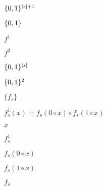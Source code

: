 \documentclass[10pt]{book}
\begin{document}
\begin{mdSnippets}
\begin{mdInlineSnippet}
$\{0,1\}^{|s|+1}$\end{mdInlineSnippet}%
\begin{mdInlineSnippet}[69d364206d67dcdb68878f093fc16950]%
$\{0,1\}$\end{mdInlineSnippet}%
\begin{mdInlineSnippet}[cae89de5c4de9177d656a557bb208967]%
$f^1$\end{mdInlineSnippet}%
\begin{mdInlineSnippet}[fb4f23824ac2741ea310a44278a235b2]%
$f^2$\end{mdInlineSnippet}%
\begin{mdInlineSnippet}[534ffd86f3d153918028a456538c34d8]%
$\{0,1\}^{|s|}$\end{mdInlineSnippet}%
\begin{mdInlineSnippet}%
$\{0,1\}^2$\end{mdInlineSnippet}%
\begin{mdInlineSnippet}[37a2ce8e5337ae1139e64a8ff1f2f6bb]%
$\{ f_s \}$\end{mdInlineSnippet}%
\begin{mdInlineSnippet}[0ca5bb58d5b81f7d402212fa3ebc2e85]%
$f^1_s(x)=f_s(0\circ x) \circ f_s(1\circ x)$\end{mdInlineSnippet}%
\begin{mdInlineSnippet}[9dd4e461268c8034f5c8564e155c67a6]%
$x$\end{mdInlineSnippet}%
\begin{mdInlineSnippet}[aa562ba5b23308d9d18c51736def9fb4]%
$f^1_s$\end{mdInlineSnippet}%
\begin{mdInlineSnippet}[d17e05375d16fa6234789202f6b79c14]%
$f_s(0 \circ x)$\end{mdInlineSnippet}%
\begin{mdInlineSnippet}%
$f_s(1 \circ x)$\end{mdInlineSnippet}%
\begin{mdInlineSnippet}[983340c663380eacde4a09812e2e3c2c]%
$f_s$\end{mdInlineSnippet}%
\begin{mdInlineSnippet}[a69897384c1a2d94b5c3560aa2c2998f]%

\end{mdInlineSnippet}
\end{mdSnippets}
\end{document}
